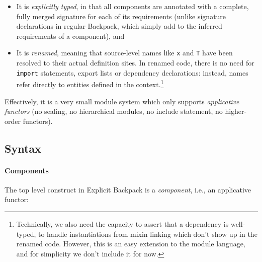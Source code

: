 \documentclass{article}
\begin{document}
\begin{itemize}
    \item It is \emph{explicitly typed}, in that all components are
    annotated with a complete, fully merged signature for each of
    its requirements (unlike \textsf{signature} declarations in
    regular Backpack, which simply add to the inferred requirements
    of a component), and
    \item It is \emph{renamed}, meaning that source-level names like
    \texttt{x} and \texttt{T} have been resolved to their actual
    definition sites.  In renamed code, there is no need for \texttt{import}
    statements, export lists
    or \textsf{dependency} declarations: instead, names refer directly
    to entities defined in the context.\footnote{Technically, we also
    need the capacity to assert that a dependency is well-typed, to
    handle instantiations from mixin linking which don't show up in
    the renamed code.  However, this is an easy extension to the
    module language, and for simplicity we don't include it for now.}
\end{itemize}

\noindent
Effectively, it is a very small module system which only supports
\emph{applicative functors} (no sealing, no hierarchical modules, no
\textsf{include} statement, no higher-order functors).

\subsection{Syntax}

\paragraph{Components}
The top level construct in Explicit Backpack is a \emph{component},
i.e., an applicative functor:
\end{document}
